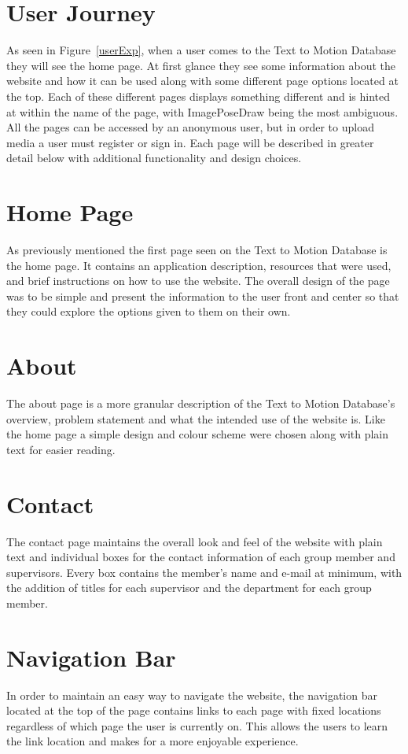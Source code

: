 \documentclass{scrreprt}
\begin{document}
\section{User Journey}
As seen in Figure~\ref{userExp}, when a user comes to the Text to Motion Database they will see the home page. At first glance they see some information about the website and how it can be used along with some different page options located at the top. Each of these different pages displays something different and is hinted at within the name of the page, with ImagePoseDraw being the most ambiguous. All the pages can be accessed by an anonymous user, but in order to upload media a user must register or sign in. Each page will be described in greater detail below with additional functionality and design choices.

\section{Home Page}
As previously mentioned the first page seen on the Text to Motion Database is the home page. It contains an application description, resources that were used, and brief instructions on how to use the website. The overall design of the page was to be simple and present the information to the user front and center so that they could explore the options given to them on their own.

\section{About}
The about page is a more granular description of the Text to Motion Database’s overview, problem statement and what the intended use of the website is. Like the home page a simple design and colour scheme were chosen along with plain text for easier reading.

\section{Contact}
The contact page maintains the overall look and feel of the website with plain text and individual boxes for the contact information of each group member and supervisors. Every box contains the member's name and e-mail at minimum, with the addition of titles for each supervisor and the department for each group member.

\section{Navigation Bar}
In order to maintain an easy way to navigate the website, the navigation bar located at the top of the page contains links to each page with fixed locations regardless of which page the user is currently on. This allows the users to learn the link location and makes for a more enjoyable experience.
\end{document}
